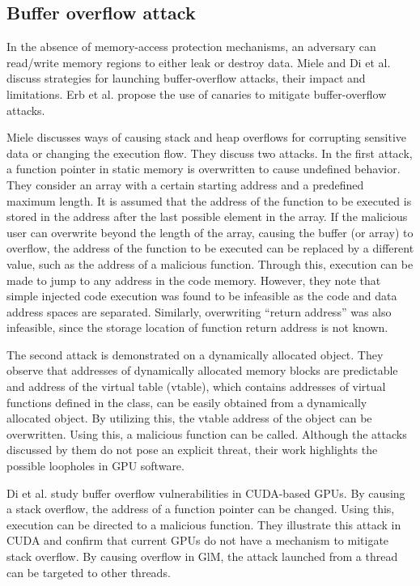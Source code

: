 
\subsection{Buffer overflow attack}\label{sec:bufferoverflow}
In the absence of memory-access protection mechanisms,  an adversary can read/write memory regions to either leak or destroy data. Miele \cite{miele2016buffer} and Di et al.  \cite{di2016study} discuss strategies for launching buffer-overflow attacks,  their impact and limitations. Erb et al. \cite{erb2017dynamic} propose the use of canaries to mitigate buffer-overflow attacks. 
 
 
Miele \cite{miele2016buffer} discusses ways of causing stack and heap overflows for corrupting sensitive data or changing the execution flow. They discuss two attacks. In the first attack, a function pointer in static memory is overwritten to cause undefined behavior. They consider an array with a certain starting address and a predefined maximum length. It is assumed that the address of the function to be executed is stored in the address after the last possible element in the array. If the malicious user can overwrite beyond the length of the array, causing the buffer (or array) to overflow, the address of the function to be executed can be replaced by a different value, such as the address of a malicious function. Through this, execution can be made to jump to any address in the code memory. However, they note that simple injected code execution was found to be infeasible as the code and data address spaces are separated. Similarly, overwriting ``return address'' was also infeasible, since the storage location of function return address is not known.

The second attack is demonstrated on a dynamically allocated object. They observe that addresses of dynamically allocated memory blocks are predictable and address of the virtual table (vtable), which contains addresses of virtual functions defined in the class, can be easily obtained from a dynamically allocated object. By utilizing this, the vtable address of the object can be overwritten. Using this, a malicious function can be called. Although the attacks discussed by them do not pose an explicit threat, their work highlights the possible loopholes in GPU software.  



Di et al. \cite{di2016study} study buffer overflow vulnerabilities in CUDA-based GPUs.  By causing a stack overflow, the address of a function pointer can be changed. Using this, execution can be directed to a malicious function. They illustrate this attack in CUDA and confirm that current GPUs do not have a mechanism to mitigate stack overflow. By causing overflow in GlM, the attack launched from a thread can be targeted to other threads. 

